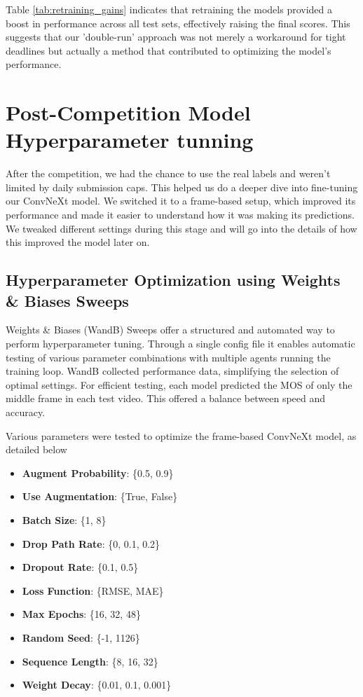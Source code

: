 \documentclass[a4paper,12pt,openright]{book}
\begin{document}
Table \ref{tab:retraining_gains} indicates that retraining the models provided a boost in performance across all test sets, effectively raising the final scores. This suggests that our 'double-run' approach was not merely a workaround for tight deadlines but actually a method that contributed to optimizing the model's performance.


\section{Post-Competition Model Hyperparameter tunning}
After the competition, we had the chance to use the real labels and weren't limited by daily submission caps. This helped us do a deeper dive into fine-tuning our ConvNeXt model. We switched it to a frame-based setup, which improved its performance and made it easier to understand how it was making its predictions. We tweaked different settings during this stage and will go into the details of how this improved the model later on.

\subsection{Hyperparameter Optimization using Weights \& Biases Sweeps}
Weights \& Biases (WandB) Sweeps offer a structured and automated way to perform hyperparameter tuning. Through a single config file it enables automatic testing of various parameter combinations with multiple agents running the training loop. WandB collected performance data, simplifying the selection of optimal settings. For efficient testing, each model predicted the MOS of only the middle frame in each test video. This offered a balance between speed and accuracy.

Various parameters were tested to optimize the frame-based ConvNeXt model, as detailed below
\begin{itemize}
    \item \textbf{Augment Probability}: \{0.5, 0.9\}
    \item \textbf{Use Augmentation}: \{True, False\}
    \item \textbf{Batch Size}: \{1, 8\}
    \item \textbf{Drop Path Rate}: \{0, 0.1, 0.2\}
    \item \textbf{Dropout Rate}: \{0.1, 0.5\}
    \item \textbf{Loss Function}: \{RMSE, MAE\}
    \item \textbf{Max Epochs}: \{16, 32, 48\}
    \item \textbf{Random Seed}: \{-1, 1126\}
    \item \textbf{Sequence Length}: \{8, 16, 32\}
    \item \textbf{Weight Decay}: \{0.01, 0.1, 0.001\}
\end{itemize}
\end{document}
